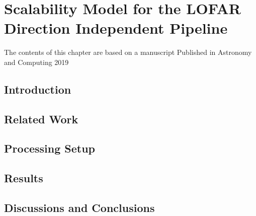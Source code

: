 \chapter{Scalability Model for the LOFAR Direction Independent Pipeline}\label{ch:Scalability_model}


\begin{frshaded*}
    The contents of this chapter are based on a manuscript Published in Astronomy and Computing 2019 
\end{frshaded*}
%

\begin{abstract}


\end{abstract}

\section{\label{sec:ch6_intro}Introduction }


\section{Related Work}\label{sec:ch6_related}


\section{Processing Setup }\label{sec:ch6_methods}



\section{Results}\label{sec:ch6_results}


\section{Discussions and Conclusions}\label{sec:ch6_discussions}



